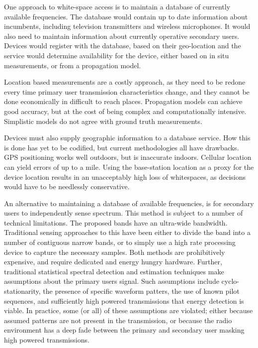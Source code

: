 \documentclass{article}
\begin{document}
One approach to white-space access is to maintain a database of currently available frequencies. The database would contain up to date information about incumbents, including television transmitters and wireless microphones. It would also need to maintain information about currently operative secondary users. Devices would register with the database, based on their geo-location and the service would determine availability for the device, either based on in situ measurements, or from a propagation model.

Location based measurements are a costly approach, as they need to be redone every time primary user transmission characteristics change, and they cannot be done economically in difficult to reach places. Propagation models can achieve good accuracy, but at the cost of being complex and computationally intensive. Simplistic models do not agree with ground truth measurements. 

Devices must also supply geographic information to a database service. How this is done has yet to be codified, but current methodologies all have drawbacks. GPS positioning works well outdoors, but is inaccurate indoors. Cellular location can yield errors of up to a mile. Using the base-station location as a proxy for the device location results in an unacceptably high loss of whitespaces, as decisions would have to be needlessly conservative.

An alternative to maintaining a database of available frequencies, is for secondary users to independently sense spectrum. This method is subject to a number of technical limitations. The proposed bands have an ultra-wide bandwidth. Traditional sensing approaches to this have been either to divide the band into a number of contiguous narrow bands, or to simply use a high rate processing device to capture the necessary samples. Both methods are prohibitively expensive, and require dedicated and energy hungry hardware. Further, traditional statistical spectral detection and estimation techniques make assumptions about the primary users signal. Such assumptions include cyclo-stationarity, the presence of specific waveform patters, the use of known pilot sequences, and sufficiently high powered transmissions that energy detection is viable. In practice, some (or all) of these assumptions are violated; either because assumed patterns are not present in the  transmission, or because the radio environment has a deep fade between the primary and secondary user masking high powered transmissions.
\end{document}
